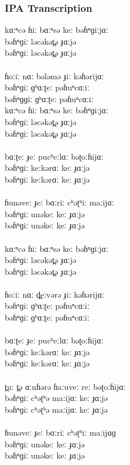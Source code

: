 \documentclass[17pt]{extarticle}
\begin{document}
\subsubsection*{\textbf{IPA Transcription}}

kɑːⁿcə ɦiː bɑːⁿsə keː bəɦⁿɡiːjɑː\\
bəɦⁿɡiː ləcəkət̪ə ɟɑːjə\\
bəɦⁿɡiː ləcəkət̪ə ɟɑːjə\\\\
ɦoːiː nɑː bələmə ɟiː kəɦərijɑː\\
bəɦⁿɡiː ɡʰɑːʈeː pəɦuⁿcɑːiː\\
bəɦⁿɡɡiː ɡʰɑːʈeː pəɦuⁿcɑːiː\\
kɑːⁿcə ɦiː bɑːⁿsə keː bəɦⁿɡiːjɑː\\
bəɦⁿɡiː ləcəkət̪ə ɟɑːjə\\
bəɦⁿɡiː ləcəkət̪ə ɟɑːjə\\\\
bɑːʈeː ɟeː pucʰeːlɑː bəʈoːɦijɑː\\
bəɦⁿɡiː keːkərɑː keː ɟɑːjə\\
bəɦⁿɡiː keːkərɑː keː ɟɑːjə\\\\
ɦunəveː ɟeː bɑːriː cʰəʈʰiː maːijɑː\\
bəɦⁿɡiː unəkeː keː ɟɑːjə\\
bəɦⁿɡiː unəkeː keː ɟɑːjə\\\\
kɑːⁿcə ɦiː bɑːⁿsə keː bəɦⁿɡiːjɑː\\
bəɦⁿɡiː ləcəkət̪ə ɟɑːjə\\
bəɦⁿɡiː ləcəkət̪ə ɟɑːjə\\\\
ɦoːiː nɑː d̪eːvərə ɟiː kəɦərijɑː\\
bəɦⁿɡiː ɡʰɑːʈeː pəɦuⁿcɑːiː\\
bəɦⁿɡiː ɡʰɑːʈeː pəɦuⁿcɑːiː\\\\
bɑːʈeː ɟeː pucʰeːlɑː bəʈoːɦijɑː\\
bəɦⁿɡiː keːkərɑː keː ɟɑːjə\\
bəɦⁿɡiː keːkərɑː keː ɟɑːjə\\\\
t̪uː t̪ə ɑːnɦərə ɦaːuveː reː bəʈoːɦijɑː\\
bəɦⁿɡiː cʰəʈʰə maːijɑː keː ɟɑːjə\\
bəɦⁿɡiː cʰəʈʰə maːijɑː keː ɟɑːjə\\\\
ɦunəveː ɟeː bɑːriː cʰəʈʰiː maːijɑɡ\\
bəɦⁿɡiː unəkeː keː ɟɑːjə\\
bəɦⁿɡiː unəkeː keː ɟɑːjə\\\\
\end{document}
